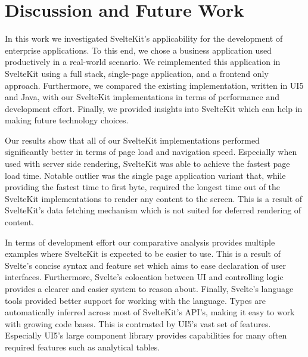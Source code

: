 \chapter{Discussion and Future Work}
\label{ch:discussion}




In this work we investigated SvelteKit's applicability for the development of enterprise applications. To this end, we chose a business application used productively in a real-world scenario. We reimplemented this application in SvelteKit using a full stack, single-page application, and a frontend only approach. Furthermore, we compared the existing implementation, written in UI5 and Java, with our SvelteKit implementations in terms of performance and development effort. Finally, we provided insights into SvelteKit which can help in making future technology choices.

Our results show that all of our SvelteKit implementations performed significantly better in terms of page load and navigation speed. Especially when used with server side rendering, SvelteKit was able to achieve the fastest page load time. Notable outlier was the single page application variant that, while providing the fastest time to first byte, required the longest time out of the SvelteKit implementations to render any content to the screen. This is a result of SvelteKit's data fetching mechanism which is not suited for deferred rendering of content.

In terms of development effort our comparative analysis provides multiple examples where SvelteKit is expected to be easier to use. This is a result of Svelte's concise syntax and feature set which aims to ease declaration of user interfaces. Furthermore, Svelte's colocation between UI and controlling logic provides a clearer and easier system to reason about. Finally, Svelte's language tools provided better support for working with the language. Types are automatically inferred across most of SvelteKit's API's, making it easy to work with growing code bases. This is contrasted by UI5's vast set of features. Especially UI5's large component library provides capabilities for many often required features such as analytical tables. 

